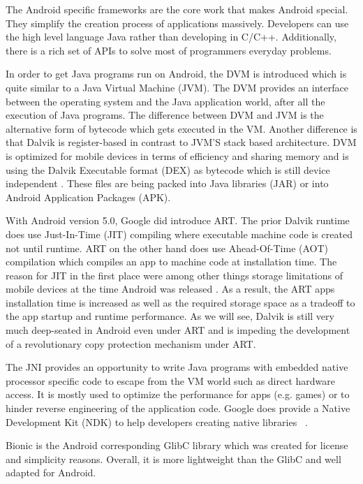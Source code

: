 The Android specific frameworks are the core work that makes Android
special. They simplify the creation process of applications massively.
Developers can use the high level language Java rather than developing
in C/C++. Additionally, there is a rich set of APIs to solve most of
programmers everyday problems.

In order to get Java programs run on Android, the DVM is introduced
which is quite similar to a Java Virtual Machine (JVM).
The DVM provides an interface between the operating system and
the Java application world, after all the execution of Java programs.
The difference between DVM and JVM is the alternative form of bytecode
which gets executed in the VM. Another difference is that Dalvik is
register-based in contrast to JVM'S stack based architecture.
DVM is optimized for mobile devices
in terms of efficiency and sharing memory and is using the
Dalvik Executable format (DEX) as bytecode which is still device
independent \parencite{levin}. These  files are being
packed into Java libraries (JAR) or into Android Application Packages (APK).

With Android version 5.0, Google did introduce ART.
The prior Dalvik runtime does use Just-In-Time (JIT) compiling
where executable machine code is created not until runtime.
ART on the other hand does use Ahead-Of-Time (AOT) compilation
which compiles an app to machine code at installation time.
The reason for JIT in the first place were among other things
storage limitations of mobile devices at the time Android was released
\parencite{levin}. As a result, the ART apps installation time
is increased as well as the required storage space as a tradeoff
to the app startup and runtime performance. As we will see,
Dalvik is still very much deep-seated in Android even under ART
and is impeding the development of a revolutionary copy protection
mechanism under ART.

The JNI provides an opportunity to write Java programs with embedded
native processor specific code to escape from the VM world
such as direct hardware access.
It is mostly used to optimize the performance for apps (e.g. games)
or to hinder reverse engineering of the application code.
Google does provide a Native Development Kit (NDK) to help
developers creating native libraries ~\parencite{ndk}.

Bionic is the Android corresponding GlibC library which was created
for license and simplicity reasons. Overall, it is more lightweight
than the GlibC and well adapted for Android.

